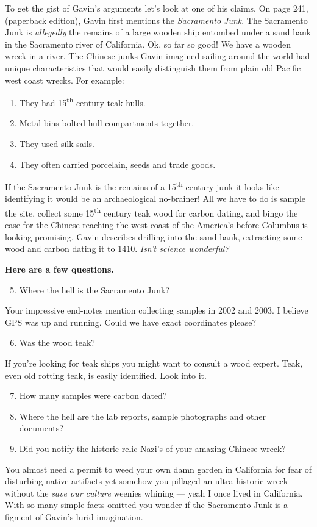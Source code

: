 To get the gist of Gavin's arguments let's look at one of his claims. On
page 241, (paperback edition), Gavin first mentions the \emph{Sacramento
Junk}. The Sacramento Junk is \emph{allegedly} the remains of a large
wooden ship entombed under a sand bank in the Sacramento river of
California. Ok, so far so good! We have a wooden wreck in a river. The
Chinese junks Gavin imagined sailing around the world had unique
characteristics that would easily distinguish them from plain old
Pacific west coast wrecks. For example:

\begin{enumerate}
\item
  They had 15\textsuperscript{th} century teak hulls.
\item
  Metal bins bolted hull compartments together.
\item
  They used silk sails.
\item
  They often carried porcelain, seeds and trade goods.
\end{enumerate}
If the Sacramento Junk is the remains of a 15\textsuperscript{th} century junk it looks
like identifying it would be an archaeological no-brainer! All we have
to do is sample the site, collect some 15\textsuperscript{th} century teak wood for carbon
dating, and bingo the case for the Chinese reaching the west coast of
the America's before Columbus is looking promising. Gavin describes
drilling into the sand bank, extracting some wood and carbon dating it
to 1410. \emph{Isn't science wonderful?}

\textbf{Here are a few questions.}

\begin{enumerate}\setcounter{enumi}{4}
\item
  Where the hell is the Sacramento Junk?
\end{enumerate}
Your impressive end-notes mention collecting samples in 2002 and 2003. I
believe GPS was up and running. Could we have exact coordinates please?

\begin{enumerate}\setcounter{enumi}{5}
\item
  Was the wood teak?
\end{enumerate}
If you're looking for teak ships you might want to consult a wood
expert. Teak, even old rotting teak, is easily identified. Look into it.

\begin{enumerate}\setcounter{enumi}{6}
\item
  How many samples were carbon dated?
\item
  Where the hell are the lab reports, sample photographs and other
  documents?
\item
  Did you notify the historic relic Nazi's of your amazing Chinese
  wreck?
\end{enumerate}
You almost need a permit to weed your own damn garden in California for
fear of disturbing native artifacts yet somehow you pillaged an
ultra-historic wreck without the \emph{save our culture} weenies whining
--- yeah I once lived in California. With so many simple facts omitted
you wonder if the Sacramento Junk is a figment of Gavin's lurid
imagination.

